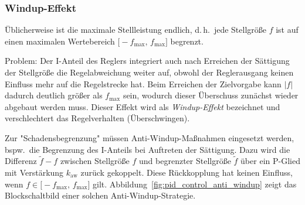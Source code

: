 \documentclass[a4paper, 11pt, accentcolor = tud3b]{tudreport}
\renewcommand{\dh}{d.\,h.~}
\newcommand{\bspw}{bspw.~}
\begin{document}
				\subsubsection{Windup-Effekt}
					Üblicherweise ist die maximale Stellleistung endlich, \dh jede Stellgröße \(f\) ist auf einen maximalen Wertebereich \( \big[ -f_\text{max},\, f_\text{max} \big] \) begrenzt.
					
					Problem: Der I-Anteil des Reglers integriert auch nach Erreichen der Sättigung der Stellgröße die Regelabweichung weiter auf, obwohl der Reglerausgang keinen Einfluss mehr auf die Regelstrecke hat. Beim Erreichen der Zielvorgabe kann \( \lvert f \rvert \) dadurch deutlich größer als \( f_\text{max} \) sein, wodurch dieser Überschuss zunächst wieder abgebaut werden muss. Dieser Effekt wird als \emph{Windup-Effekt} bezeichnet und verschlechtert das Regelverhalten (Überschwingen).
					
					Zur "Schadensbegrenzung" müssen Anti-Windup-Maßnahmen eingesetzt werden, \bspw die Begrenzung des I-Anteils bei Auftreten der Sättigung. Dazu wird die Differenz \( \tilde{f} - f \) zwischen Stellgröße \(f\) und begrenzter Stellgröße \( \tilde{f} \) über ein P-Glied mit Verstärkung \( k_\text{aw} \) zurück gekoppelt. Diese Rückkopplung hat keinen Einfluss, wenn \( f \in \big[ -f_\text{max},\, f_\text{max} \big] \) gilt. Abbildung~\ref{fig:pid_control_anti_windup} zeigt das Blockschaltbild einer solchen Anti-Windup-Strategie.
					
\end{document}
